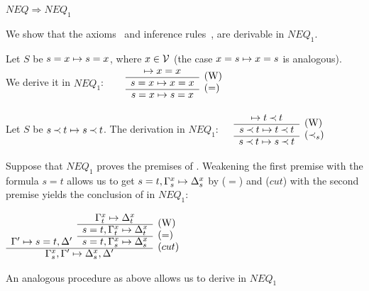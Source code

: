 \begin{LEMMA}\label{le:neqtoneq1} $NEQ \Rightarrow NEQ_1$ \end{LEMMA}
\begin{PROOF}
We show that the axioms~ and inference rules~,
 are derivable in $NEQ_1$.
\begin{LS}\MyLPar
\item Let $S$ be $s=x\mathrel{\mapsto} s=x$, where $x\in\mbox{$\cal V$}$ (the case
$x=s\mathrel{\mapsto} x=s$ is analogous). \\ We derive it in $NEQ_1$: \ \ \ 
\( \begin{array}{cl}
  \Seq x=x & \raisebox{-1.2ex}[1.5ex][0ex]{(W)} \\ \cline{1-1}
  s=x\Seq x=x & \raisebox{-1.2ex}[1.5ex][0ex]{($=$)} \\ \cline{1-1}
  s=x\Seq s=x
\end{array} \) 
\item Let $S$ be $s\mathbin{\prec} t\mathrel{\mapsto} s\mathbin{\prec} t$. The derivation in $NEQ_1$:\ \ \ 
\( \begin{array}{cl}
  \Seq t\Incl t & \raisebox{-1.2ex}[1.5ex][0ex]{(W)} \\ \cline{1-1}
  s\Incl t\Seq t\Incl t & \raisebox{-1.2ex}[1.5ex][0ex]{($\Incl_s$)} \\ \cline{1-1}
  s\Incl t\Seq s\Incl t
\end{array} \)
\item Suppose that $NEQ_1$ proves the premises of . Weakening the
first premise with the formula $s=t$ allows us to get $s=t,\Gamma_s^x\mathrel{\mapsto}\Delta_s^x$ by
($=$) and ($cut$) with the second premise yields the conclusion of 
\reff{ru:neqeq} in $NEQ_1$:
\begin{center} \( \begin{array}{ccl}
 & \Gamma_t^x\Seq\Delta_t^x & \raisebox{-1.2ex}[1.5ex][0ex]{(W)} \\ \cline{2-2}
 & s=t,\Gamma_t^x\Seq\Delta_t^x & \raisebox{-1.2ex}[1.5ex][0ex]{($=$)} 
      \\ \cline{2-2}
\Gamma'\Seq s=t,\Delta' & s=t,\Gamma_s^x\Seq\Delta_s^x 
   & \raisebox{-1.2ex}[1.5ex][0ex]{($cut$)} \\ \cline{1-2}
\multicolumn{2}{c}{\Gamma_s^x,\Gamma'\Seq\Delta_s^x,\Delta'}
\end{array} \) \end{center}
\item An analogous procedure as above allows us to derive  in $NEQ_1$
\end{LS}
\end{PROOF}

